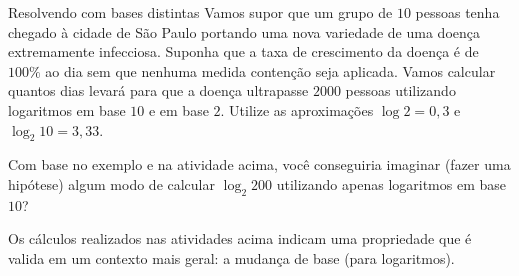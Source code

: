 \begin{task}{Resolvendo com bases distintas}
Vamos supor que um grupo de $10$ pessoas tenha chegado à cidade de São Paulo portando uma nova variedade de uma doença extremamente infecciosa. Suponha que a taxa de crescimento da doença é de $100\%$ ao dia sem que nenhuma medida contenção seja aplicada. Vamos calcular quantos dias levará para que a doença ultrapasse $2000$ pessoas utilizando logaritmos em base $10$ e em base $2$. Utilize as aproximações $\log 2 = 0{,}3$ e $\log_2 10 = 3{,}33$.
\end{task}


\begin{reflection}
Com base no exemplo e na atividade acima, você conseguiria imaginar (fazer uma hipótese) algum modo de calcular $\log_2 200$ utilizando apenas logaritmos em base $10$?
\end{reflection}


Os cálculos realizados nas atividades acima indicam uma propriedade que é valida em um contexto mais geral: a mudança de base (para logaritmos).

